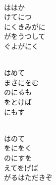 \documentclass[10pt,b5j]{tarticle} %
\begin{document}
\begin{enumerate}
\begin{minipage}[c]{\blocksize}
        \vspace{\linespace}
        \item~\\
        ははか\\
        けてにつ\\
        にくきみがに\\
        がをうつして\\
        ぐよがにく
        
        \vspace{\linespace}
        \item~\\
        はめて\\
        まさにをむ\\
        のにるも\\
        をとけば\\
        にもす
        
        \vspace{\linespace}
        \item~\\
        はのて\\
        をにをく\\
        のにすを\\
        えてをげば\\
        がるはただきぞ
    
    \end{minipage}
\end{enumerate} %
\end{document}

